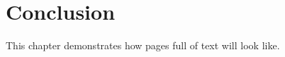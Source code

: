 
\chapter{Conclusion}
\label{chap:conclusion}

This chapter demonstrates how pages full of text will look like.

\lipsum[1-15]


